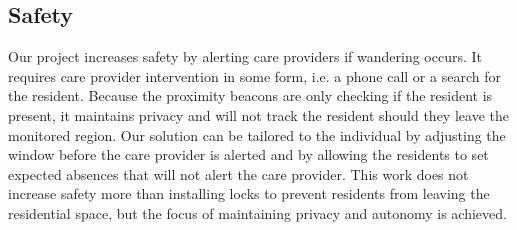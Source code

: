 \documentclass[11pt]{article}
\begin{document}
\subsection{Safety}
Our project increases safety by alerting care providers if wandering occurs. It requires care provider intervention in some form, i.e. a phone call or a search for the resident. Because the proximity beacons are only checking if the resident is present, it maintains privacy and will not track the resident should they leave the monitored region. Our solution can be tailored to the individual by adjusting the window before the care provider is alerted and by allowing the residents to set expected absences that will not alert the care provider. This work does not increase safety more than installing locks to prevent residents from leaving the residential space, but the focus of maintaining privacy and autonomy is achieved. 
 
 


\printbibliography
\end{document}
